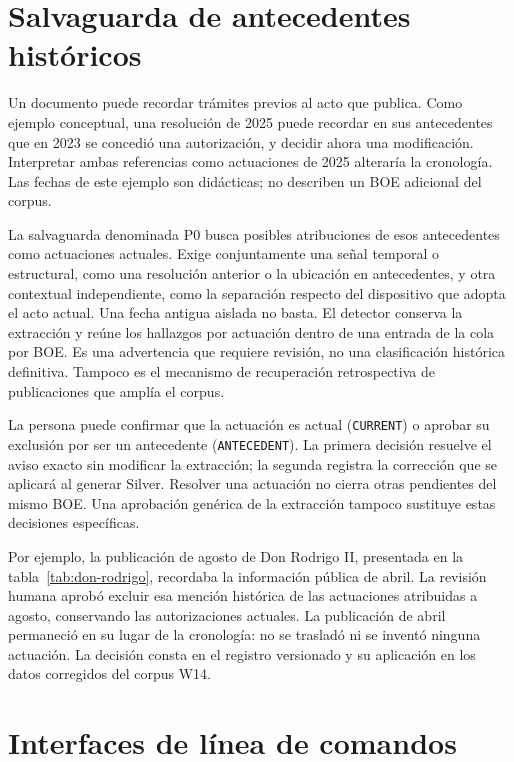 \section{Salvaguarda de antecedentes históricos}
\label{sec:antecedentes}

Un documento puede recordar trámites previos al acto que publica.
Como ejemplo conceptual, una resolución de 2025 puede recordar en sus
antecedentes que en 2023 se concedió una autorización, y decidir ahora una
modificación. Interpretar ambas referencias como actuaciones de 2025 alteraría
la cronología. Las fechas de este ejemplo son didácticas; no describen un BOE
adicional del corpus.

La salvaguarda denominada P0 busca posibles atribuciones de esos antecedentes
como actuaciones actuales. Exige conjuntamente una señal temporal o
estructural, como una resolución anterior o la ubicación en antecedentes,
y otra contextual independiente, como la separación respecto del dispositivo
que adopta el acto actual. Una fecha antigua aislada no basta. El detector conserva la extracción
y reúne los hallazgos por actuación
dentro de una entrada de la cola por BOE. Es una advertencia que requiere
revisión, no una clasificación histórica definitiva. Tampoco es el mecanismo
de recuperación retrospectiva de publicaciones que amplía el corpus.

La persona puede confirmar que la actuación es actual (\texttt{CURRENT}) o
aprobar su exclusión por ser un antecedente (\texttt{ANTECEDENT}). La primera
decisión resuelve el aviso exacto sin modificar la extracción; la segunda
registra la corrección que se aplicará al generar Silver. Resolver una
actuación no cierra otras pendientes del mismo BOE. Una aprobación genérica
de la extracción tampoco sustituye estas decisiones específicas.

Por ejemplo, la publicación de agosto de Don Rodrigo II, presentada en la
tabla~\ref{tab:don-rodrigo}, recordaba la información pública de abril.
La revisión humana aprobó excluir esa mención histórica de las actuaciones
atribuidas a agosto, conservando las autorizaciones actuales. La publicación
de abril permaneció en su lugar de la cronología: no se trasladó ni se
inventó ninguna actuación. La decisión consta en el registro versionado y
su aplicación en los datos corregidos del corpus W14.

\section{Interfaces de línea de comandos}
\label{sec:cli}

